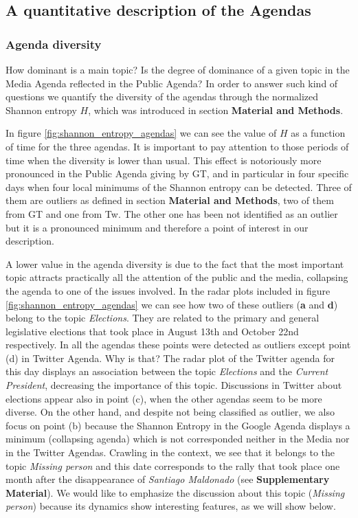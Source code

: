 \documentclass{bmcart}
\begin{document}
\subsection*{A quantitative description of the Agendas}

\subsubsection*{Agenda diversity}

\par How dominant is a main topic? Is the degree of dominance of a given topic in the Media Agenda reflected in the Public Agenda? In order to answer such kind of questions we quantify the diversity of the agendas through the normalized Shannon entropy $H$, which was introduced in section \textbf{Material and Methods}.
\par In figure \ref{fig:shannon_entropy_agendas} we can see the value of $H$ as a function of time for the three agendas. It is important to pay attention to those periods of time when the diversity is lower than usual. This effect is notoriously more pronounced in the Public Agenda giving by GT, and in particular in four specific days when four local minimums of the Shannon entropy can be detected. Three of them are outliers as defined in section \textbf{Material and Methods}, two of them from GT and one from Tw. The other one has been not identified as an outlier but it is a pronounced minimum and therefore a point of interest in our description. 
 
\par A lower value in the agenda diversity is due to the fact that the most important topic attracts practically all the attention of the public and the media, collapsing the agenda to one of the issues involved.
In the radar plots included in figure \ref{fig:shannon_entropy_agendas} we can see how two of these outliers (\textbf{a} and \textbf{d}) belong to the topic \emph{Elections}. They are related to the primary and general legislative elections that took place in August 13th and October 22nd respectively.
In all the agendas these points were detected as outliers except point (d) in Twitter Agenda. Why is that? The radar plot of the Twitter agenda for this day displays an association between the topic \emph{Elections} and the \emph{Current President}, decreasing the importance of this topic.
Discussions in Twitter about elections appear also in point (c), when the other agendas seem to be more diverse. 
On the other hand, and despite not being classified as outlier, we also focus on point (b) because the Shannon Entropy in the Google Agenda displays a minimum (collapsing agenda) which is not corresponded neither in the Media nor in the Twitter Agendas. Crawling in the context, we see that it belongs to the topic \emph{Missing person} and this date corresponds to the rally that took place one month after the disappearance of \emph{Santiago Maldonado} (see \textbf{Supplementary Material}). 
We  would like to emphasize the discussion about this topic (\emph{Missing person}) because its dynamics show interesting features, as we will show below.
\end{document}
